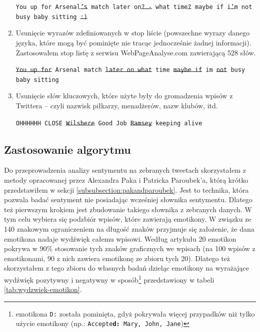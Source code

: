 \begin{enumerate}
  \texttt{You up for Arsenal\sout{'s} match later on\sout{? -} what
  time\sout{?} maybe if i\sout{'}m not busy baby sitting \sout{:)}} 
	
	\item Usunięcie wyrazów zdefiniowanych w stop liście (powszechne wyrazy danego
	języka, które mogą być pominięte nie tracąc jednocześnie żadnej informacji).
	Zastosowałem stop listę z serwisu \mbox{WebPageAnalyse.com} 
	\cite{WebPageAnalyse} zawierającą 528 słów.

	\texttt{\sout{You up for} Arsenal match \sout{later on what} time \sout{maybe if} 
 	im \sout{not} busy baby sitting}
	
	\item Usunięcie słów kluczowych, które użyte były do gromadzenia wpisów z
	Twittera -- czyli nazwisk piłkarzy, menadżerów, nazw klubów, itd.
	
	
	\texttt{OHHHHHH CLOSE \sout{Wilshere} Good Job \sout{Ramsey} keeping alive}
	
\end{enumerate}





\subsection{Zastosowanie algorytmu}
\label{subsection:sentyment-algorytm}

Do przeprowadzenia analizy sentymentu na zebranych tweetach skorzystałem z
metody opracowanej przez Alexandra Paka i Patricka Paroubek'a, którą krótko
przedstawiłem w sekcji \ref{subsubsection:pakandparoubek}.
Jest to technika, która pozwala badać sentyment nie posiadając wcześniej
słownika sentymentu. Dlatego też pierwszym krokiem jest zbudowanie takiego
słownika z zebranych danych.
W tym celu wybiera się podzbiór wpisów, które zawierają emotikony.
W związku ze 140 znakowym ograniczeniem na długość znaków przyjmuje się
założenie, że dana emotikona nadaje wydźwięk całemu wpisowi.
Według artykułu \cite{EmoticonAnalysisTwitter} 20 emotikon pokrywa w 90\%
stosowanie tych znaków graficznych we wpisach (na 100 wpisów z emotikonami, 90 z
nich zawiera emotikonę ze zbioru tych 20). Dlatego też skorzystałem z tego
zbioru do własnych badań dzieląc emotikony na wyrażające wydźwięk pozytywny i
negatywny w sposób\footnote{emotikona \texttt{D:} została pominięta, gdyż
pokrywała więcej przypadków niż tylko użycie emotikony (np.:
\texttt{Accepte\textbf{d:} Mary, John, Jane})} przedstawiony w tabeli
\ref{tab:wydzwiek-emotikon}.


